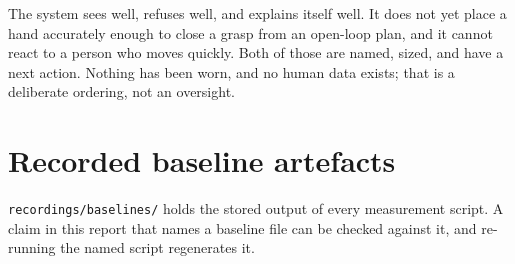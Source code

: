 \documentclass[11pt,a4paper,oneside]{report}
\newcommand{\file}[1]{\texttt{\small #1}}
\begin{document}
The system sees well, refuses well, and explains itself well. It does not yet
place a hand accurately enough to close a grasp from an open-loop plan, and it
cannot react to a person who moves quickly. Both of those are named, sized, and
have a next action. Nothing has been worn, and no human data exists; that is a
deliberate ordering, not an oversight.




\appendix



\chapter{Recorded baseline artefacts}
\file{recordings/baselines/} holds the stored output of every measurement script. A claim in this report that names a baseline file can be checked against it, and re-running the named script regenerates it.
\end{document}

